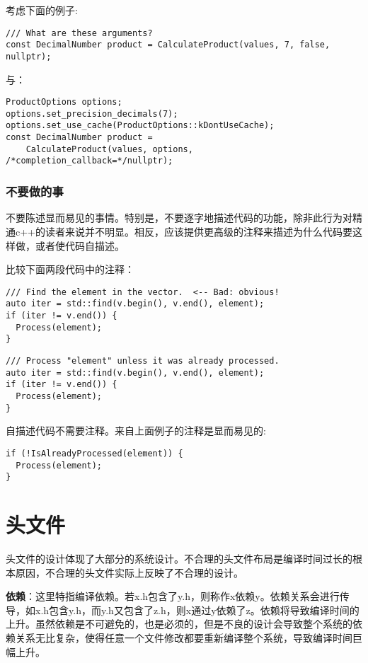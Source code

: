 考虑下面的例子:
\begin{verbatim}
/// What are these arguments?
const DecimalNumber product = CalculateProduct(values, 7, false, nullptr);
\end{verbatim}
与：
\begin{verbatim}
ProductOptions options;
options.set_precision_decimals(7);
options.set_use_cache(ProductOptions::kDontUseCache);
const DecimalNumber product =
    CalculateProduct(values, options, /*completion_callback=*/nullptr);
\end{verbatim}


\subsection{不要做的事}
不要陈述显而易见的事情。特别是，不要逐字地描述代码的功能，除非此行为对精通c++的读者来说并不明显。相反，应该提供更高级的注释来描述为什么代码要这样做，或者使代码自描述。

比较下面两段代码中的注释：
\begin{verbatim}
/// Find the element in the vector.  <-- Bad: obvious!
auto iter = std::find(v.begin(), v.end(), element);
if (iter != v.end()) {
  Process(element);
}
\end{verbatim}
\begin{verbatim}
/// Process "element" unless it was already processed.
auto iter = std::find(v.begin(), v.end(), element);
if (iter != v.end()) {
  Process(element);
}
\end{verbatim}
自描述代码不需要注释。来自上面例子的注释是显而易见的:
\begin{verbatim}
if (!IsAlreadyProcessed(element)) {
  Process(element);
}
\end{verbatim}


\chapter{头文件}
头文件的设计体现了大部分的系统设计。不合理的头文件布局是编译时间过长的根本原因，不合理的头文件实际上反映了不合理的设计。

\textbf{依赖}：这里特指编译依赖。若x.h包含了y.h，则称作x依赖y。依赖关系会进行传导，如x.h包含y.h，而y.h又包含了z.h，则x通过y依赖了z。依赖将导致编译时间的上升。虽然依赖是不可避免的，也是必须的，但是不良的设计会导致整个系统的依赖关系无比复杂，使得任意一个文件修改都要重新编译整个系统，导致编译时间巨幅上升。

